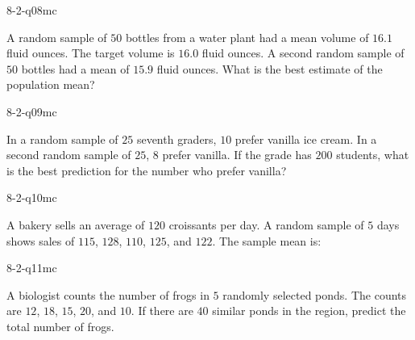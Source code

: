 \begin{practiceQuestion}{8-2-q08}{mc}
\begin{questionText}
A random sample of $50$ bottles from a water plant had a mean volume of $16.1$ fluid ounces. The target volume is $16.0$ fluid ounces. A second random sample of $50$ bottles had a mean of $15.9$ fluid ounces. What is the best estimate of the population mean?
\end{questionText}
\end{practiceQuestion}

\begin{practiceQuestion}{8-2-q09}{mc}
\begin{questionText}
In a random sample of $25$ seventh graders, $10$ prefer vanilla ice cream. In a second random sample of $25$, $8$ prefer vanilla. If the grade has $200$ students, what is the best prediction for the number who prefer vanilla?
\end{questionText}
\end{practiceQuestion}

\begin{practiceQuestion}{8-2-q10}{mc}
\begin{questionText}
A bakery sells an average of $120$ croissants per day. A random sample of $5$ days shows sales of $115$, $128$, $110$, $125$, and $122$. The sample mean is:
\end{questionText}
\end{practiceQuestion}

\begin{practiceQuestion}{8-2-q11}{mc}
\begin{questionText}
A biologist counts the number of frogs in $5$ randomly selected ponds. The counts are $12$, $18$, $15$, $20$, and $10$. If there are $40$ similar ponds in the region, predict the total number of frogs.
\end{questionText}
\end{practiceQuestion}


